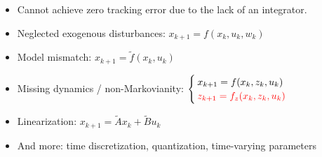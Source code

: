 \begin{itemize}
    \item Cannot achieve zero tracking error due to the lack of an integrator.
    \item Neglected exogenous disturbances: \qquad $x_{k+1} = f(x_k, u_k, w_k)$
    \item Model mismatch: \qquad $x_{k+1} = \tilde{f}(x_k, u_k)$
    \item Missing dynamics / non-Markovianity: \qquad $
    \begin{cases}
        x_{k+1} = f(x_k, z_k, u_k) \\
        \textcolor{red}{z_{k+1} = f_z(x_k, z_k, u_k)}
    \end{cases}
    $
    \item Linearization: \qquad $x_{k+1} = \tilde{A}x_k + \tilde{B}u_k$
    \item And more: time discretization, quantization, time-varying parameters
\end{itemize}

